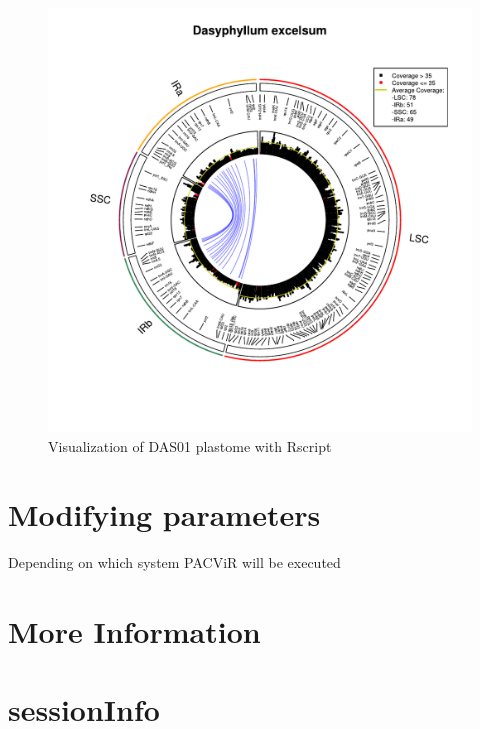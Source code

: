 \documentclass[letterpaper]{article}
\begin{document}
  \begin{figure}[H]
  \centering
    \includegraphics{DAS01_WS250_TH35.pdf}
    \caption{Visualization of DAS01 plastome with Rscript}
  \centering
  \end{figure}
  
\section{Modifying parameters}

  Depending on which system PACViR will be executed

\section{More Information}

\section{sessionInfo}
\end{document}
